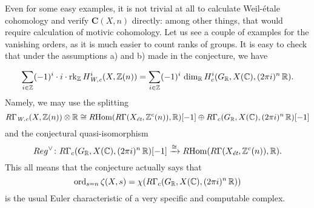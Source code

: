 \documentclass{article}
\theoremstyle{plain}
\begin{document}
Even for some easy examples, it is not trivial at all to calculate Weil-étale
cohomology and verify $\mathbf{C} (X,n)$ directly: among other things, that
would require calculation of motivic cohomology. Let us see a couple of examples
for the vanishing orders, as it is much easier to count ranks of groups.
It is easy to check that under the assumptions a) and b) made in the conjecture,
we have

\[ \sum_{i\in\mathbb{Z}} (-1)^i \cdot i\cdot \operatorname{rk}_{\mathbb{Z}} H^i_\text{\it W,c} (X, \mathbb{Z}(n)) =
  \sum_{i\in\mathbb{Z}} (-1)^i \, \dim_{\mathbb{R}} H^i_c (G_{\mathbb{R}}, X (\mathbb{C}), (2\pi i)^n\,\mathbb{R}). \]
Namely, we may use the splitting
\[
  R\Gamma_\text{\it W,c} (X,\mathbb{Z}(n)) \otimes \mathbb{R} \cong
  R\!\operatorname{Hom} (R\Gamma (X_\text{\it ét}, \mathbb{Z}^c (n)), \mathbb{R}) [-1]
  \oplus
  R\Gamma_c (G_{\mathbb{R}}, X (\mathbb{C}), (2\pi i)^n\,\mathbb{R}) [-1] \]
and the conjectural quasi-isomorphism
\[ Reg^\vee\colon R\Gamma_c (G_{\mathbb{R}}, X(\mathbb{C}), (2\pi i)^n\,\mathbb{R}) [-1]
  \xrightarrow{\cong}
  R\!\operatorname{Hom}(R\Gamma(X_\text{\it ét}, \mathbb{Z}^c (n)), \mathbb{R}). \]
This all means that the conjecture actually says that
$$\operatorname{ord}_{s=n} \zeta (X,s) = \chi (R\Gamma_c (G_{\mathbb{R}}, X(\mathbb{C}), (2\pi i)^n\,\mathbb{R}))$$
is the usual Euler characteristic of a very specific and computable complex.
\end{document}
